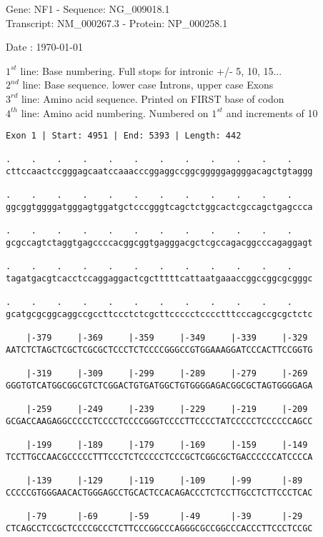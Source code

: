 \documentclass{article}
\begin{document}
\begin{center}
\begin{large}
Gene: NF1 - Sequence: NG\_009018.1\\
Transcript: NM\_000267.3 - Protein: NP\_000258.1
 
 Date : \today
\end{large}
\end{center}
$1^{st}$ line: Base numbering. Full stops for intronic +/- 5, 10, 15...\\
$2^{nd}$ line: Base sequence. lower case Introns, upper case Exons\\
$3^{rd}$ line: Amino acid sequence. Printed on FIRST base of codon\\
$4^{th}$ line: Amino acid numbering. Numbered on $1^{st}$ and increments of 10\\
\begin{Verbatim}[fontfamily=courier]
Exon 1 | Start: 4951 | End: 5393 | Length: 442

.    .    .    .    .    .    .    .    .    .    .    .    
cttccaactccgggagcaatccaaacccggaggccggcgggggaggggacagctgtaggg

.    .    .    .    .    .    .    .    .    .    .    .    
ggcggtggggatgggagtggatgctcccgggtcagctctggcactcgccagctgagccca

.    .    .    .    .    .    .    .    .    .    .    .    
gcgccagtctaggtgagccccacggcggtgagggacgctcgccagacggcccagaggagt

.    .    .    .    .    .    .    .    .    .    .    .    
tagatgacgtcacctccaggaggactcgctttttcattaatgaaaccggccggcgcgggc

.    .    .    .    .    .    .    .    .    .    .    .    
gcatgcgcggcaggccgccttccctctcgcttccccctcccctttcccagccgcgctctc

    |-379     |-369     |-359     |-349     |-339     |-329 
AATCTCTAGCTCGCTCGCGCTCCCTCTCCCCGGGCCGTGGAAAGGATCCCACTTCCGGTG

    |-319     |-309     |-299     |-289     |-279     |-269 
GGGTGTCATGGCGGCGTCTCGGACTGTGATGGCTGTGGGGAGACGGCGCTAGTGGGGAGA

    |-259     |-249     |-239     |-229     |-219     |-209 
GCGACCAAGAGGCCCCCTCCCCTCCCCGGGTCCCCTTCCCCTATCCCCCTCCCCCCAGCC

    |-199     |-189     |-179     |-169     |-159     |-149 
TCCTTGCCAACGCCCCCTTTCCCTCTCCCCCTCCCGCTCGGCGCTGACCCCCCATCCCCA

    |-139     |-129     |-119     |-109     |-99      |-89  
CCCCCGTGGGAACACTGGGAGCCTGCACTCCACAGACCCTCTCCTTGCCTCTTCCCTCAC

    |-79      |-69      |-59      |-49      |-39      |-29  
CTCAGCCTCCGCTCCCCGCCCTCTTCCCGGCCCAGGGCGCCGGCCCACCCTTCCCTCCGC

\end{Verbatim}
\end{document}
